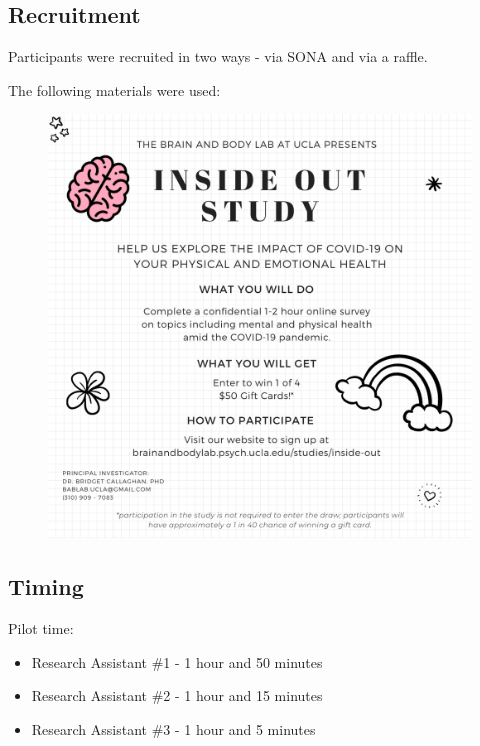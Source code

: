 \documentclass[]{book}
\providecommand{\tightlist}{%
  \setlength{\itemsep}{0pt}\setlength{\parskip}{0pt}}
\begin{document}
\hypertarget{recruitment}{%
\subsection{Recruitment}\label{recruitment}}

Participants were recruited in two ways - via SONA and via a raffle.

The following materials were used:

\begin{figure}
\centering
\includegraphics{images/inside_out_instagram.png}
\caption{}
\end{figure}

\hypertarget{timing}{%
\subsection{Timing}\label{timing}}

Pilot time:

\begin{itemize}
\tightlist
\item
  Research Assistant \#1 - 1 hour and 50 minutes
\item
  Research Assistant \#2 - 1 hour and 15 minutes
\item
  Research Assistant \#3 - 1 hour and 5 minutes
\end{itemize}
\end{document}
